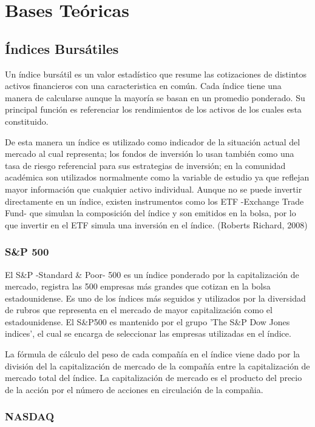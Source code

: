\documentclass[a4paper,12pt]{Latex/Classes/PhDthesisPSnPDF}
\begin{document}
\section{Bases Teóricas}

\subsection{Índices Bursátiles}

Un índice bursátil es un valor estadístico que resume las cotizaciones de distintos activos financieros con una caracteristica en común. Cada índice tiene una manera de calcularse aunque la mayoría se basan en un promedio ponderado. Su principal función es referenciar los rendimientos de los activos de los cuales esta constituido.

De esta manera un índice es utilizado como indicador de la situación actual del mercado al cual representa; los fondos de inversión lo usan también como una tasa de riesgo referencial para sus estrategias de inversión; en la comunidad académica son utilizados normalmente como la variable de estudio ya que reflejan mayor información que cualquier activo individual. Aunque no se puede invertir directamente en un índice, existen instrumentos como los ETF -Exchange Trade Fund- que simulan la composición del índice y son emitidos en la bolsa, por lo que invertir en el ETF simula una inversión en el índice. (Roberts Richard, 2008)

\subsubsection{S\&P 500}

El S\&P -Standard \& Poor- 500 es un índice ponderado por la capitalización de mercado, registra las 500 empresas más grandes que cotizan en la bolsa estadounidense. Es uno de los índices más seguidos y utilizados por la diversidad de rubros que representa en el mercado de mayor capitalización como el estadounidense. El S\&P500 es mantenido por el grupo 'The S\&P Dow Jones indices', el cual se encarga de seleccionar las empresas utilizadas en el índice. 

La fórmula de cálculo del peso de cada compañía en el índice viene dado por la división del la capitalización de mercado de la compañía entre la capitalización de mercado total del índice. La capitalización de mercado es el producto del precio de la acción por el número de acciones en circulación de la compañia.

\subsubsection{NASDAQ}
\end{document}
